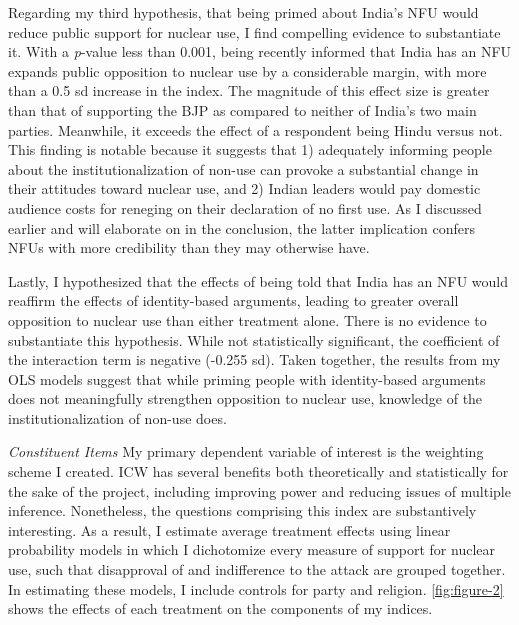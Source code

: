 \documentclass[12pt]{article}
\begin{document}
Regarding my third hypothesis, that being primed about India's NFU would reduce public support for nuclear use, I find compelling evidence to substantiate it. With a \textit{p}-value less than 0.001, being recently informed that India has an NFU expands public opposition to nuclear use by a considerable margin, with more than a 0.5 sd increase in the index. The magnitude of this effect size is greater than that of supporting the BJP as compared to neither of India's two main parties. Meanwhile, it exceeds the effect of a respondent being Hindu versus not. This finding is notable because it suggests that 1) adequately informing people about the institutionalization of non-use can provoke a substantial change in their attitudes toward nuclear use, and 2) Indian leaders would pay domestic audience costs for reneging on their declaration of no first use. As I discussed earlier and will elaborate on in the conclusion, the latter implication confers NFUs with more credibility than they may otherwise have.

Lastly, I hypothesized that the effects of being told that India has an NFU would reaffirm the effects of identity-based arguments, leading to greater overall opposition to nuclear use than either treatment alone. There is no evidence to substantiate this hypothesis. While not statistically significant, the coefficient of the interaction term is negative (-0.255 sd). Taken together, the results from my OLS models suggest that while priming people with identity-based arguments does not meaningfully strengthen opposition to nuclear use, knowledge of the institutionalization of non-use does. 

\textit{Constituent Items} My primary dependent variable of interest is the weighting scheme I created. ICW has several benefits both theoretically and statistically for the sake of the project, including improving power and reducing issues of multiple inference. Nonetheless, the questions comprising this index are substantively interesting. As a result, I estimate average treatment effects using linear probability models in which I dichotomize every measure of support for nuclear use, such that disapproval of and indifference to the attack are grouped together.  In estimating these models, I include controls for party and religion. \autoref{fig:figure-2} shows the effects of each treatment on the components of my indices.
\end{document}

